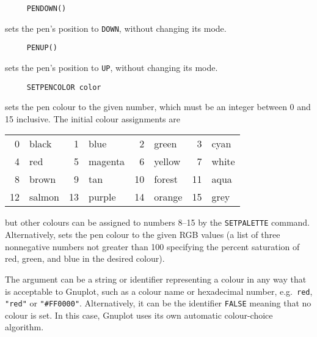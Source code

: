 \begin{verbatim}
     PENDOWN()
\end{verbatim}
sets the pen's position to \texttt{DOWN}, without changing its mode.

\begin{verbatim}
     PENUP()
\end{verbatim}
sets the pen's position to \texttt{UP}, without changing its mode.




\begin{verbatim}
     SETPENCOLOR color
\end{verbatim}
\label{logoturtle:setpencolor}
sets the pen colour to the given number, which must be an integer
between 0 and 15 inclusive.  The initial colour assignments are
\begin{center}
  \begin{tabular}{rlrlrlrl}
    0 & black  &  1 & blue    &  2 & green  &  3 & cyan  \\
    4 & red    &  5 & magenta &  6 & yellow &  7 & white \\
    8 & brown  &  9 & tan     & 10 & forest & 11 & aqua  \\
    12 & salmon & 13 & purple  & 14 & orange & 15 & grey
  \end{tabular}
\end{center}
but other colours can be assigned to numbers 8--15 by the
\texttt{SETPALETTE} command.  Alternatively, sets the pen colour to
the given RGB values (a list of three nonnegative numbers not greater
than 100 specifying the percent saturation of red, green, and blue in
the desired colour).

The argument can be a string or identifier representing a colour in
any way that is acceptable to Gnuplot, such as a colour name or
hexadecimal number, e.g.\ \texttt{red}, \texttt{"red"} or
\texttt{"\#FF0000"}.  Alternatively, it can be the identifier
\texttt{FALSE} meaning that no colour is set.  In this case, Gnuplot
uses its own automatic colour-choice algorithm.

